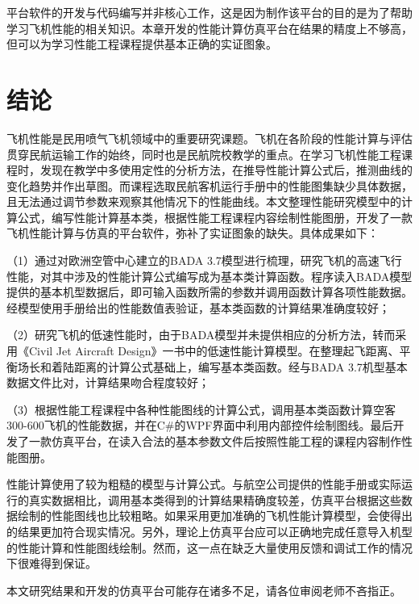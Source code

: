 \documentclass[a4paper,punct,space,heading=true,AutoFakeBold]{ctexrep}
\begin{document}
平台软件的开发与代码编写并非核心工作，这是因为制作该平台的目的是为了帮助学习飞机性能的相关知识。本章开发的性能计算仿真平台在结果的精度上不够高，但可以为学习性能工程课程提供基本正确的实证图象。



\chapter{结论}

飞机性能是民用喷气飞机领域中的重要研究课题。飞机在各阶段的性能计算与评估贯穿民航运输工作的始终，同时也是民航院校教学的重点。在学习飞机性能工程课程时，发现在教学中多使用定性的分析方法，在推导性能计算公式后，推测曲线的变化趋势并作出草图。而课程选取民航客机运行手册中的性能图集缺少具体数据，且无法通过调节参数来观察其他情况下的性能曲线。本文整理性能研究模型中的计算公式，编写性能计算基本类，根据性能工程课程内容绘制性能图册，开发了一款飞机性能计算与仿真的平台软件，弥补了实证图象的缺失。具体成果如下：

（1）通过对欧洲空管中心建立的BADA 3.7模型进行梳理，研究飞机的高速飞行性能，对其中涉及的性能计算公式编写成为基本类计算函数。程序读入BADA模型提供的基本机型数据后，即可输入函数所需的参数并调用函数计算各项性能数据。经模型使用手册给出的性能数值表验证，基本类函数的计算结果准确度较好；

（2）研究飞机的低速性能时，由于BADA模型并未提供相应的分析方法，转而采用《Civil Jet Aircraft Design》一书中的低速性能计算模型。在整理起飞距离、平衡场长和着陆距离的计算公式基础上，编写基本类函数。经与BADA 3.7机型基本数据文件比对，计算结果吻合程度较好；

（3）根据性能工程课程中各种性能图线的计算公式，调用基本类函数计算空客300-600飞机的性能数据，并在C\#的WPF界面中利用内部控件绘制图线。最后开发了一款仿真平台，在读入合法的基本参数文件后按照性能工程的课程内容制作性能图册。

性能计算使用了较为粗糙的模型与计算公式。与航空公司提供的性能手册或实际运行的真实数据相比，调用基本类得到的计算结果精确度较差，仿真平台根据这些数据绘制的性能图线也比较粗略。如果采用更加准确的飞机性能计算模型，会使得出的结果更加符合现实情况。另外，理论上仿真平台应可以正确地完成任意导入机型的性能计算和性能图线绘制。然而，这一点在缺乏大量使用反馈和调试工作的情况下很难得到保证。

本文研究结果和开发的仿真平台可能存在诸多不足，请各位审阅老师不吝指正。
\end{document}
